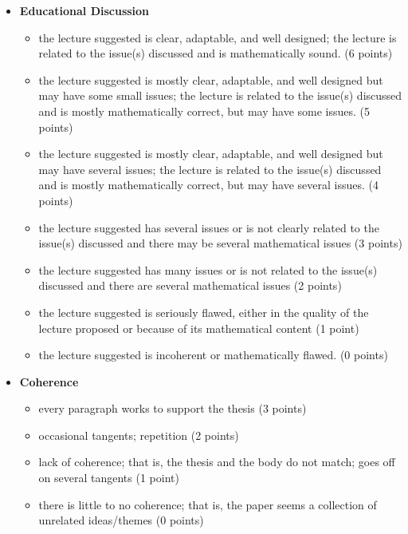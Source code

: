 \documentclass[11pt,letterpaper]{article}
\begin{document}
\begin{itemize}
\item \textbf{Educational Discussion}
\begin{itemize}
\item[\underline{\hspace{.2in}}] the lecture suggested is clear, adaptable, and well designed; the lecture is related to the issue(s) discussed and is mathematically sound. (6 points)
\item[\underline{\hspace{.2in}}] the lecture suggested is mostly clear, adaptable, and well designed but may have some small issues; the lecture is related to the issue(s) discussed and is mostly mathematically correct, but may have some issues. (5 points)
\item[\underline{\hspace{.2in}}] the lecture suggested is mostly clear, adaptable, and well designed but may have several issues; the lecture is related to the issue(s) discussed and is mostly mathematically correct, but may have several issues. (4 points)
\item[\underline{\hspace{.2in}}] the lecture suggested has several issues or is not clearly related to the issue(s) discussed and there may be several mathematical issues (3 points)
\item[\underline{\hspace{.2in}}] the lecture suggested has many issues or is not related to the issue(s) discussed and there are several mathematical issues (2 points)
\item[\underline{\hspace{.2in}}] the lecture suggested is seriously flawed, either in the quality of the lecture proposed or because of its mathematical content (1 point)
\item[\underline{\hspace{.2in}}] the lecture suggested is incoherent or mathematically flawed. (0 points)
\end{itemize}

\item \textbf{Coherence}
\begin{itemize}
\item[\underline{\hspace{.2in}}] every paragraph works to support the thesis (3 points)
\item[\underline{\hspace{.2in}}] occasional tangents; repetition (2 points)
\item[\underline{\hspace{.2in}}] lack of coherence; that is, the thesis and the body do not match; goes off on several tangents (1 point)
\item[\underline{\hspace{.2in}}] there is little to no coherence; that is, the paper seems a collection of unrelated ideas/themes (0 points)
\end{itemize}


\end{itemize}
\end{document}
